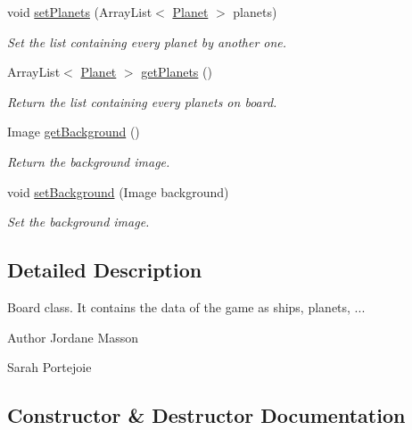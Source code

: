 \begin{DoxyCompactItemize}
void \hyperlink{classfr_1_1groupe40_1_1projet_1_1model_1_1board_1_1_galaxy_a7f400bf11202afef051fccbc9cc727a9}{set\+Planets} (Array\+List$<$ \hyperlink{classfr_1_1groupe40_1_1projet_1_1model_1_1planets_1_1_planet}{Planet} $>$ planets)
\begin{DoxyCompactList}\small\item\em Set the list containing every planet by another one. \end{DoxyCompactList}\item 
Array\+List$<$ \hyperlink{classfr_1_1groupe40_1_1projet_1_1model_1_1planets_1_1_planet}{Planet} $>$ \hyperlink{classfr_1_1groupe40_1_1projet_1_1model_1_1board_1_1_galaxy_a9e97906db3f8da0d99dfcb0f272d476b}{get\+Planets} ()
\begin{DoxyCompactList}\small\item\em Return the list containing every planets on board. \end{DoxyCompactList}\item 
Image \hyperlink{classfr_1_1groupe40_1_1projet_1_1model_1_1board_1_1_galaxy_adc4718307d1288fe07acabd1f31415c9}{get\+Background} ()
\begin{DoxyCompactList}\small\item\em Return the background image. \end{DoxyCompactList}\item 
void \hyperlink{classfr_1_1groupe40_1_1projet_1_1model_1_1board_1_1_galaxy_a765e649c1488992dbf1247ae9a1adaf7}{set\+Background} (Image background)
\begin{DoxyCompactList}\small\item\em Set the background image. \end{DoxyCompactList}\end{DoxyCompactItemize}


\subsection{Detailed Description}
\textquotesingle{}Board\textquotesingle{} class. It contains the data of the game as ships, planets, ... 

\begin{DoxyAuthor}{Author}
Jordane Masson 

Sarah Portejoie 
\end{DoxyAuthor}


\subsection{Constructor \& Destructor Documentation}
\mbox{\label{classfr_1_1groupe40_1_1projet_1_1model_1_1board_1_1_galaxy_ae10e23d6a41a5b878123a8b03ec31e5a}} 
